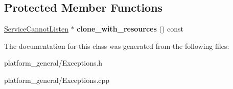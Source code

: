 \subsection*{\-Protected \-Member \-Functions}
\begin{DoxyCompactItemize}
\item 
\hypertarget{classgeneral__server_1_1ServiceCannotListen_a5f6dc7eadf92c0e849ae8f63d76a9dbc}{\hyperlink{classgeneral__server_1_1ServiceCannotListen}{\-Service\-Cannot\-Listen} $\ast$ {\bfseries clone\-\_\-with\-\_\-resources} () const }\label{classgeneral__server_1_1ServiceCannotListen_a5f6dc7eadf92c0e849ae8f63d76a9dbc}

\end{DoxyCompactItemize}


\-The documentation for this class was generated from the following files\-:\begin{DoxyCompactItemize}
\item 
platform\-\_\-general/\-Exceptions.\-h\item 
platform\-\_\-general/\-Exceptions.\-cpp\end{DoxyCompactItemize}
